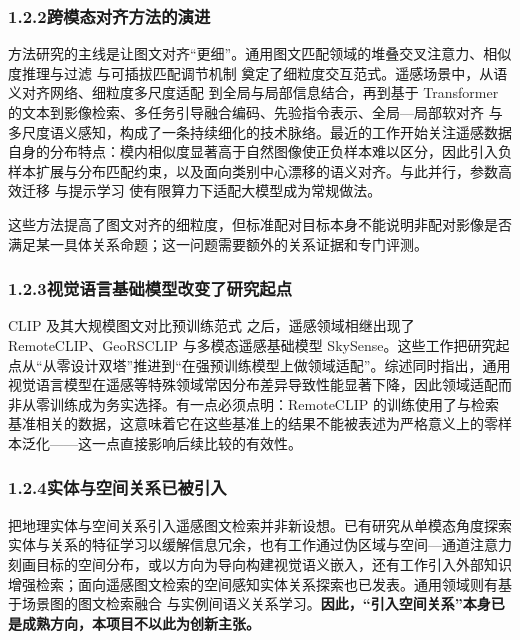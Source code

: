 \subsubsection*{1.2.2\quad 跨模态对齐方法的演进}

方法研究的主线是让图文对齐“更细”。通用图文匹配领域的堆叠交叉注意力\cite{lee2018scan}、相似度推理与过滤\cite{diao2021sgraf} 与可插拔匹配调节机制\cite{diao2023regulator} 奠定了细粒度交互范式。遥感场景中，从语义对齐网络\cite{cheng2021dsan}、细粒度多尺度适配\cite{yuan2022amfmn} 到全局与局部信息结合\cite{yuan2022galr}，再到基于 Transformer 的文本到影像检索\cite{rahhal2022multilanguage}、多任务引导融合编码\cite{fusionencoder2023}、先验指令表示\cite{pan2023pir}、全局—局部软对齐\cite{zhang2024glisa} 与多尺度语义感知\cite{mssa2025}，构成了一条持续细化的技术脉络。最近的工作开始关注遥感数据自身的分布特点：模内相似度显著高于自然图像使正负样本难以区分，因此引入负样本扩展与分布匹配约束\cite{dcca2026}，以及面向类别中心漂移的语义对齐\cite{cglsa2026}。与此并行，参数高效迁移\cite{yuan2023peft} 与提示学习\cite{zhou2022cocoop} 使有限算力下适配大模型成为常规做法。

这些方法提高了图文对齐的细粒度，但标准配对目标本身不能说明非配对影像是否满足某一具体关系命题；这一问题需要额外的关系证据和专门评测。

\subsubsection*{1.2.3\quad 视觉语言基础模型改变了研究起点}

CLIP 及其大规模图文对比预训练范式\cite{radford2021clip} 之后，遥感领域相继出现了 RemoteCLIP\cite{liu2024remoteclip}、GeoRSCLIP\cite{zhang2024rs5m} 与多模态遥感基础模型 SkySense\cite{guo2024skysense}。这些工作把研究起点从“从零设计双塔”推进到“在强预训练模型上做领域适配”。综述同时指出，通用视觉语言模型在遥感等特殊领域常因分布差异导致性能显著下降\cite{li2024vlmrsmag,wuhui2026rsitr}，因此领域适配而非从零训练成为务实选择。有一点必须点明：RemoteCLIP 的训练使用了与检索基准相关的数据\cite{liu2024remoteclip}，这意味着它在这些基准上的结果不能被表述为严格意义上的零样本泛化——这一点直接影响后续比较的有效性。

\subsubsection*{1.2.4\quad 实体与空间关系已被引入}

把地理实体与空间关系引入遥感图文检索并非新设想。已有研究从单模态角度探索实体与关系的特征学习以缓解信息冗余\cite{zhang2023unimodal}，也有工作通过伪区域与空间—通道注意力刻画目标的空间分布\cite{wu2024scat}，或以方向为导向构建视觉语义嵌入\cite{yang2024dove}，还有工作引入外部知识增强检索\cite{mi2024knowledgeaware}；面向遥感图文检索的空间感知实体关系探索也已发表\cite{shui2025esrn}。通用领域则有基于场景图的图文检索融合\cite{sgfn2023} 与实例间语义关系学习\cite{pan2023semrel}。\textbf{因此，“引入空间关系”本身已是成熟方向，本项目不以此为创新主张。}

